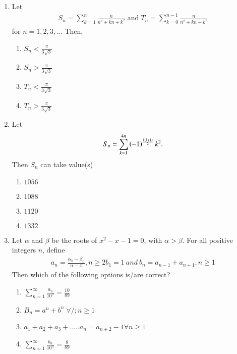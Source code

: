\documentclass[journal]{IEEEtran}
\theoremstyle{remark}
\begin{document}
\begin{enumerate}
\item Let 
\begin{align*}
S_n=\sum_{k=1}^{n}\frac{n}{n^2+kn+k^2} \; \text{and} \;  T_n=\sum_{k=0}^{n-1}\frac{n}{n^2+kn+k^2}
\end{align*}
for $n=1,2,3,\dots$ Then,\hfill{}
\begin{multicols}{4}
\begin{enumerate}
\item $S_n<\frac{\pi}{3\sqrt{3}}$
\item $S_n>\frac{\pi}{3\sqrt{3}}$
\item $T_n<\frac{\pi}{3\sqrt{3}}$
\item $T_n>\frac{\pi}{3\sqrt{3}}$
\end{enumerate}
\end{multicols}

\item Let \begin{align*} S_n=\sum_{k=1}^{4n}\left(-1\right)^\frac{k\left(k+1\right)}{2}k^2.\end{align*}  Then $S_n$ can take value(s)  \hfill{}
\begin{multicols}{4}
\begin{enumerate}
\item $1056$
\item $1088$
\item $1120$
\item $1332$
\end{enumerate}
\end{multicols}

\item Let $\alpha$ and $\beta$ be the roots of $x^2-x-1=0$, with $\alpha>\beta$. For all positive integers $n$, define
\begin{align*}
a_n=\frac{\alpha_n-\beta_n}{\alpha-\beta},n\geq2
b_1=1 \: and \: b_n=a_{n-1}+a_{n+1},n\geq1
\end{align*}
Then which of the following options is/are correct?
\hfill{}
\begin{multicols}{2}
\begin{enumerate}
\item $\sum_{n=1}^{\infty}\frac{a_n}{10^n}=\frac{10}{89}$
\item $B_n=a^n+b^n \; \forall /; n\geq1$
\item $a_1+a_2+a_3+.....a_n=a_{n+2}-1 \forall n\geq1$
\item $\sum_{n=1}^{\infty}\frac{b_n}{10^n}=\frac{8}{89}$
\end{enumerate}
\end{multicols}
\end{enumerate}
\end{document}

